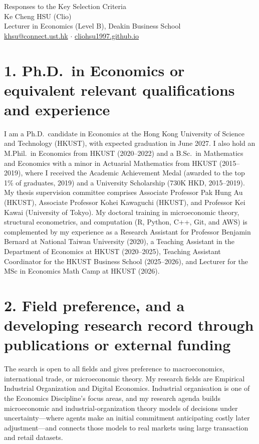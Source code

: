 \documentclass[11pt]{article}
\begin{document}
\begin{center}
{\Large Responses to the Key Selection Criteria}\\[0.3em]
Ke Cheng HSU (Clio)\\[0.15em]
Lecturer in Economics (Level B), Deakin Business School\\
{\small \href{mailto:khsu@connect.ust.hk}{khsu@connect.ust.hk} $\cdot$ \href{https://cliohsu1997.github.io/}{cliohsu1997.github.io}}
\end{center}

\vspace{0.15em}
\section*{1. Ph.D.\ in Economics or equivalent relevant qualifications and experience}

I am a Ph.D.\ candidate in Economics at the Hong Kong University of Science and Technology (HKUST), with expected graduation in June 2027. I also hold an M.Phil.\ in Economics from HKUST (2020--2022) and a B.Sc.\ in Mathematics and Economics with a minor in Actuarial Mathematics from HKUST (2015--2019), where I received the Academic Achievement Medal (awarded to the top 1\% of graduates, 2019) and a University Scholarship (730K HKD, 2015--2019). My thesis supervision committee comprises Associate Professor Pak Hung Au (HKUST), Associate Professor Kohei Kawaguchi (HKUST), and Professor Kei Kawai (University of Tokyo). My doctoral training in microeconomic theory, structural econometrics, and computation (R, Python, C++, Git, and AWS) is complemented by my experience as a Research Assistant for Professor Benjamin Bernard at National Taiwan University (2020), a Teaching Assistant in the Department of Economics at HKUST (2020--2025), Teaching Assistant Coordinator for the HKUST Business School (2025--2026), and Lecturer for the MSc in Economics Math Camp at HKUST (2026).

\section*{2. Field preference, and a developing research record through publications or external funding}

The search is open to all fields and gives preference to macroeconomics, international trade, or microeconomic theory. My research fields are Empirical Industrial Organization and Digital Economics. Industrial organisation is one of the Economics Discipline's focus areas, and my research agenda builds microeconomic and industrial-organization theory models of decisions under uncertainty---where agents make an initial commitment anticipating costly later adjustment---and connects those models to real markets using large transaction and retail datasets.
\end{document}
